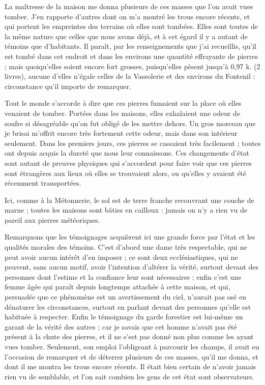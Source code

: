 \documentclass[a4paper, 11pt, oneside, polutonikogreek, french]{article}
\begin{document}
La maîtresse de la maison me donna plusieurs de ces masses que l'on avait vues tomber. J'en rapporte d'autres dont on m'a montré les trous encore récents, et qui portent les empreintes des terrains où elles sont tombées. Elles sont toutes de la même nature que celles que nous avons déjà, et à cet égard il y a autant de témoins que d'habitants. Il paraît, par les renseignements que j'ai recueillis, qu'il est tombé dans cet endroit et dans les environs une quantité effrayante de pierres ; mais quoiqu'elles soient encore fort grosses, puisqu'elles pèsent jusqu'à 0,97 k. (2 livres), aucune d'elles n'égale celles de la Vassolerie et des environs du Fontenil : circonstance qu'il importe de remarquer.

Tout le monde s'accorde à dire que ces pierres fumaient sur la place où elles venaient de tomber. Portées dans les maisons, elles exhalaient une odeur de soufre si désagréable qu'on fut obligé de les mettre dehors. Un gros morceau que je brisai m'offrit encore très fortement cette odeur, mais dans son intérieur seulement. Dans les premiers jours, ces pierres se cassaient très facilement ; toutes ont depuis acquis la dureté que nous leur connaissons. Ces changements d'état sont autant de preuves physiques qui s'accordent pour faire voir que ces pierres sont étrangères aux lieux où elles se trouvaient alors, ou qu'elles y avaient été récemment transportées.

Ici, comme à la Métonnerie, le sol est de terre franche recouvrant une couche de marne ; toutes les maisons sont bâties en cailloux : jamais on n'y a rien vu de pareil aux pierres météoriques.

Remarquons que les témoignages acquièrent ici une grande force par l'état et les qualités morales des témoins. C'est d'abord une dame très respectable, qui ne peut avoir aucun intérêt d'en imposer ; ce sont deux ecclésiastiques, qui ne peuvent, sans aucun motif, avoir l'intention d'altérer la vérité, surtout devant des personnes dont l'estime et la confiance leur sont nécessaires ; enfin c'est une femme âgée qui paraît depuis longtemps attachée à cette maison, et qui, persuadée que ce phénomène est un avertissement du ciel, n'aurait pas osé en dénaturer les circonstances, surtout en parlant devant des personnes qu'elle est habituée à respecter. Enfin le témoignage du garde forestier est lui-même un garant de la vérité des autres ; car je savais que cet homme n'avait pas été présent à la chute des pierres, et il ne s'est pas donné non plus comme les ayant vues tomber. Seulement, son emploi l'obligeant à parcourir les champs, il avait eu l'occasion de remarquer et de déterrer plusieurs de ces masses, qu'il me donna, et dont il me montra les trous encore récents. Il était bien certain de n'avoir jamais rien vu de semblable, et l'on sait combien les gens de cet état sont observateurs.
\end{document}
